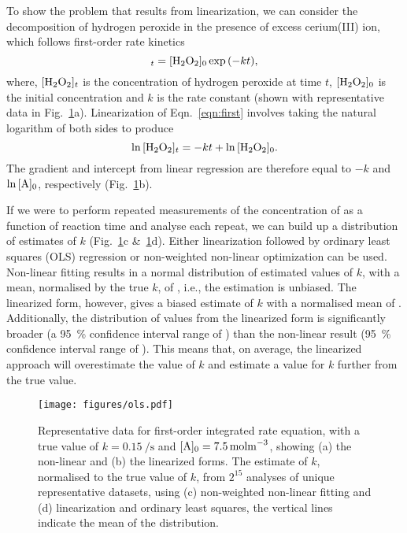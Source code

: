 \documentclass[journal=jceda8,manuscript=article]{achemso}
\begin{document}
To show the problem that results from linearization, we can consider the decomposition of hydrogen peroxide  in the presence of excess cerium(III) ion, which follows first-order rate kinetics~\cite{monk_math_2010}
%
\begin{equation}
    [\ce{H2O2}]_t = [\ce{H2O2}]_0\exp{(-kt)},
    \label{eqn:first}
\end{equation}
%
where, $[\ce{H2O2}]_t$ is the concentration of hydrogen peroxide at time $t$, $[\ce{H2O2}]_0$ is the initial concentration and $k$ is the rate constant (shown with representative data in Fig.~\ref{fig:ols}a).
Linearization of Eqn.~\ref{eqn:first} involves taking the natural logarithm of both sides to produce
%
\begin{equation}
    \ln{[\ce{H2O2}]_t} = -kt + \ln{[\ce{H2O2}]_0}.
    \label{eqn:log}
\end{equation}
%
The gradient and intercept from linear regression are therefore equal to $-k$ and $\ln{[\ce{A}]_0}$, respectively (Fig.~\ref{fig:ols}b).

If we were to perform repeated measurements of the concentration of  as a function of reaction time and analyse each repeat, we can build up a distribution of estimates of $k$ (Fig.~\ref{fig:ols}c \&~\ref{fig:ols}d). 
Either linearization followed by ordinary least squares (OLS) regression or non-weighted non-linear optimization can be used. 
Non-linear fitting results in a normal distribution of estimated values of $k$, with a mean, normalised by the true $k$, of , i.e., the estimation is unbiased. 
The linearized form, however, gives a biased estimate of $k$ with a normalised mean of . 
Additionally, the distribution of values from the linearized form is significantly broader (a \SI{95}{\percent} confidence interval range of ) than the non-linear result (\SI{95}{\percent} confidence interval range of ).
This means that, on average, the linearized approach will overestimate the value of $k$ and estimate a value for $k$ further from the true value. 
%
\begin{figure}
  \texttt{[image: figures/ols.pdf]}
  \caption{
    Representative data for first-order integrated rate equation, with a true value of $k=\SI{0.15}{\per\second}$ and $[\ce{A}]_0=\SI{7.5}{\mol\m^{-3}}$, showing (a) the non-linear and (b) the linearized forms. 
    The estimate of $k$, normalised to the true value of $k$, from $2^{15}$ analyses of unique representative datasets, using (c) non-weighted non-linear fitting and (d) linearization and ordinary least squares, the vertical lines indicate the mean of the distribution. 
    }
  \label{fig:ols}
\end{figure}
%
\end{document}
